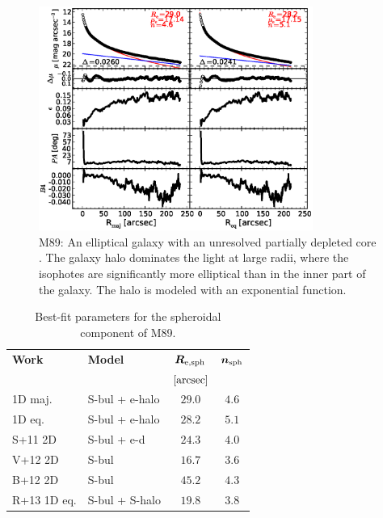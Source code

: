 \documentclass[preprint2]{emulateapj}
\newcommand{\fitfigurewidth}{0.8\textwidth}
\begin{document}
  \begin{figure}[h]
  \begin{center}
  \includegraphics[width=\fitfigurewidth]{images/m89_1Dfit.eps}
  \caption{M89: 
  An elliptical galaxy with an unresolved partially depleted core \citep{rusli2013}. 
  The galaxy halo dominates the light at large radii, where the isophotes are significantly more elliptical than in the inner part of the galaxy. 
  The halo is modeled with an exponential function. 
  }
  \end{center}
  \end{figure}

  \begin{table}[h]
  \small
  \caption{Best-fit parameters for the spheroidal component of M89.}
  \begin{center}
  \begin{tabular}{llcc}
  \hline
  {\bf Work} & {\bf Model}   & $\bm R_{\rm e,sph}$    & $\bm n_{\rm sph}$ \\
    &  &  $[\rm arcsec]$ & \\
  \hline
  1D maj. & S-bul + e-halo  & $29.0$  &  $4.6$ \\
  1D eq.  & S-bul + e-halo  & $28.2$  &  $5.1$ \\
  \hline
  S+11 2D         & S-bul + e-d     & $24.3$  &  $4.0$ \\
  V+12 2D         & S-bul           & $16.7$  &  $3.6$ \\
  B+12 2D         & S-bul           & $45.2$  &  $4.3$ \\
  R+13 1D eq.         & S-bul + S-halo  & $19.8$  &  $3.8$ \\
  \hline
  \end{tabular}
  \end{center}
  \label{tab:m89}
  \end{table}
\end{document}

